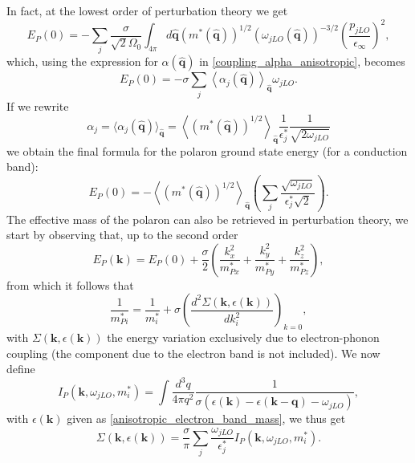 In fact, at the lowest order of perturbation theory we get \cite{de2023high}
\begin{equation}
    E_P(0)=-\sum_j \frac{\sigma}{\sqrt{2}\Omega_0}\int_{4\pi}d\hat{\mathbf{q}}(m^*(\hat{\mathbf{q}}))^{1/2}(\omega_{jLO}(\hat{\mathbf{q}}))^{-3/2}\left(\frac{p_{jLO}}{\epsilon_\infty}\right)^2,
\end{equation}
which, using the expression for $\alpha(\hat{\mathbf{q}})$ in \ref{coupling_alpha_anisotropic}, becomes
\begin{equation}
    E_P(0)=-\sigma\sum_j\left \langle  \alpha_j(\hat{\mathbf{q}}) \right \rangle_{\hat{\mathbf{q}}}\omega_{jLO}.
\end{equation}
If we rewrite
\begin{equation}
    \alpha_j=\langle\alpha_j(\hat{\mathbf{q}})\rangle_{\hat{\mathbf{q}}}=\left\langle (m^*(\hat{\mathbf{q}}))^{1/2} \right\rangle_{\hat{\mathbf{q}}} \frac{1}{\epsilon^*_j}\frac{1}{\sqrt{2\omega_{jLO}}}
\end{equation}
we obtain the final formula for the polaron ground state energy (for a conduction band):
\begin{equation}
    E_P(0)=-\left \langle  (m^*(\hat{\mathbf{q}}))^{1/2} \right\rangle_{\hat{\mathbf{q}}} \left(\sum_j\frac{\sqrt{\omega_{jLO}}}{\epsilon^*_j\sqrt{2}}\right).
\end{equation}
The effective mass of the polaron can also be retrieved in perturbation theory, we start by observing that, up to the second order \cite{guster2021frohlich}
\begin{equation}
    E_P(\mathbf{k})=E_P(0)+\frac{\sigma}{2}\left(\frac{k^2_x}{m^*_{Px}}+\frac{k^2_y}{m^*_{Py}}+\frac{k^2_z}{m^*_{Pz}}\right),
\end{equation}
from which it follows that
\begin{equation}
    \frac{1}{m^*_{Pi}}=\frac{1}{m^*_i}+\sigma\left(\frac{d^2\Sigma(\mathbf{k},\epsilon(\mathbf{k}))}{dk_i^2}\right)_{k=0},
\end{equation}
with $\Sigma(\mathbf{k},\epsilon(\mathbf{k}))$ the energy variation exclusively due to electron-phonon coupling (the component due to the electron band 
is not included). We now define
\begin{equation}
    I_P(\mathbf{k},\omega_{jLO},m^*_i)=\int\frac{d^3q}{4\pi q^2}\frac{1}{\sigma\left(\epsilon(\mathbf{k})-\epsilon(\mathbf{k-q})-\omega_{jLO}\right)},
\end{equation}
with $\epsilon(\mathbf{k})$ given as \ref{anisotropic_electron_band_mass}, we thus get
\begin{equation}
    \Sigma(\mathbf{k},\epsilon(\mathbf{k}))=\frac{\sigma}{\pi}\sum_j\frac{\omega_{jLO}}{\epsilon^*_j}I_P(\mathbf{k},\omega_{jLO},m^*_i).
\end{equation}
